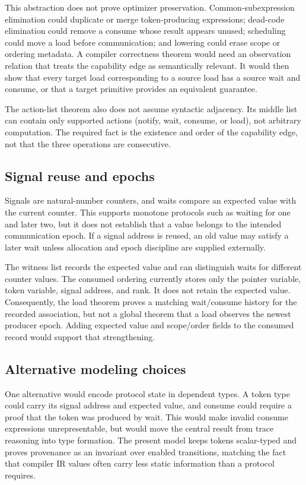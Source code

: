 \documentclass[a4paper,USenglish]{lipics-v2021}
\begin{document}
This abstraction does not prove optimizer preservation. Common-subexpression
elimination could duplicate or merge token-producing expressions; dead-code
elimination could remove a consume whose result appears unused; scheduling
could move a load before communication; and lowering could erase scope or
ordering metadata. A compiler correctness theorem would need an observation
relation that treats the capability edge as semantically relevant. It would
then show that every target load corresponding to a source load has a source
wait and consume, or that a target primitive provides an equivalent guarantee.

The action-list theorem also does not assume syntactic adjacency. Its middle
list can contain only supported actions (notify, wait, consume, or load), not
arbitrary computation. The
required fact is the existence and order of the capability edge, not that the
three operations are consecutive.

\subsection{Signal reuse and epochs}
Signals are natural-number counters, and waits compare an expected value with
the current counter. This supports monotone protocols such as waiting for one
and later two, but it does not establish that a value belongs to the intended
communication epoch. If a signal address is reused, an old value may satisfy a
later wait unless allocation and epoch discipline are supplied externally.

The witness list records the expected value and can distinguish waits for
different counter values. The consumed ordering currently stores only the
pointer variable, token variable, signal address, and rank. It does not retain
the expected value. Consequently, the load theorem proves a matching
wait/consume history for the recorded association, but not a global theorem
that a load observes the newest producer epoch. Adding expected value and
scope/order fields to the consumed record would support that strengthening.

\subsection{Alternative modeling choices}
One alternative would encode protocol state in dependent types. A token type
could carry its signal address and expected value, and consume could require a
proof that the token was produced by wait. This would make invalid consume
expressions unrepresentable, but would move the central result from trace
reasoning into type formation. The present model keeps tokens scalar-typed and
proves provenance as an invariant over enabled transitions, matching the fact
that compiler IR values often carry less static information than a protocol
requires.
\end{document}
